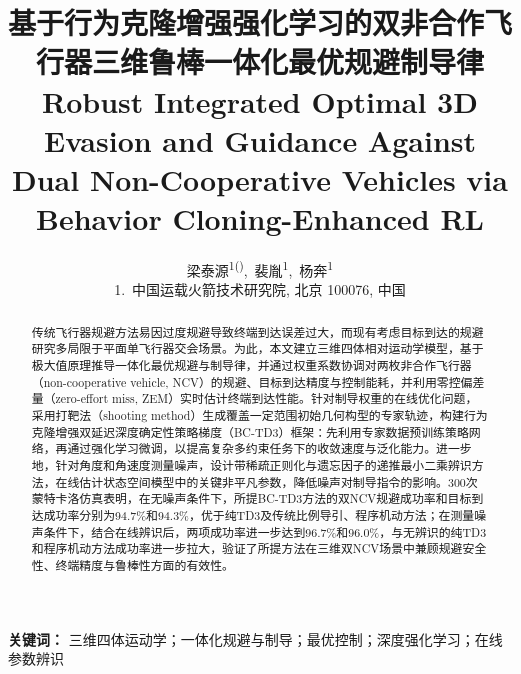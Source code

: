 

\title{基于行为克隆增强强化学习的双非合作飞行器三维鲁棒一体化最优规避制导律\\[0.6em]
{\large Robust Integrated Optimal 3D Evasion and Guidance Against Dual Non-Cooperative Vehicles via Behavior Cloning-Enhanced RL}}
\author{%
梁泰源\textsuperscript{1()},~裴胤\textsuperscript{1},~杨奔\textsuperscript{1}\\[0.6em]
{\normalsize 1.~中国运载火箭技术研究院, 北京 100076, 中国}%
}
\date{}


\maketitle

\begin{abstract}
传统飞行器规避方法易因过度规避导致终端到达误差过大，而现有考虑目标到达的规避研究多局限于平面单飞行器交会场景。为此，本文建立三维四体相对运动学模型，基于极大值原理推导一体化最优规避与制导律，并通过权重系数协调对两枚非合作飞行器（non-cooperative vehicle, NCV）的规避、目标到达精度与控制能耗，并利用零控偏差量（zero-effort miss, ZEM）实时估计终端到达性能。针对制导权重的在线优化问题，采用打靶法（shooting method）生成覆盖一定范围初始几何构型的专家轨迹，构建行为克隆增强双延迟深度确定性策略梯度（BC-TD3）框架：先利用专家数据预训练策略网络，再通过强化学习微调，以提高复杂多约束任务下的收敛速度与泛化能力。进一步地，针对角度和角速度测量噪声，设计带稀疏正则化与遗忘因子的递推最小二乘辨识方法，在线估计状态空间模型中的关键非平凡参数，降低噪声对制导指令的影响。300次蒙特卡洛仿真表明，在无噪声条件下，所提BC-TD3方法的双NCV规避成功率和目标到达成功率分别为94.7\%和94.3\%，优于纯TD3及传统比例导引、程序机动方法；在测量噪声条件下，结合在线辨识后，两项成功率进一步达到96.7\%和96.0\%，与无辨识的纯TD3和程序机动方法成功率进一步拉大，验证了所提方法在三维双NCV场景中兼顾规避安全性、终端精度与鲁棒性方面的有效性。
\end{abstract}

\noindent\textbf{关键词：} 三维四体运动学；一体化规避与制导；最优控制；深度强化学习；在线参数辨识

%
%
%









\printbibliography[title={参考文献}]

